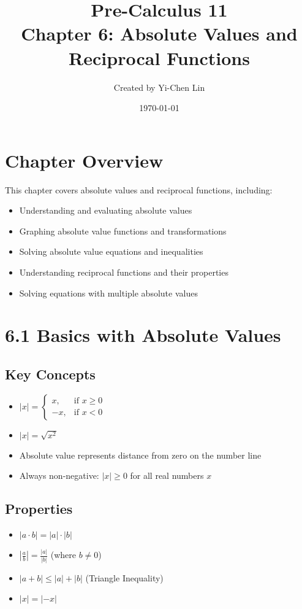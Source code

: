 \documentclass[12pt]{article}
\title{Pre-Calculus 11 \\ Chapter 6: Absolute Values and Reciprocal Functions}
\author{Created by Yi-Chen Lin}
\date{\today}
\begin{document}
\maketitle

\section*{Chapter Overview}
This chapter covers absolute values and reciprocal functions, including:
\begin{itemize}
    \item Understanding and evaluating absolute values
    \item Graphing absolute value functions and transformations
    \item Solving absolute value equations and inequalities
    \item Understanding reciprocal functions and their properties
    \item Solving equations with multiple absolute values
\end{itemize}

\section{6.1 Basics with Absolute Values}
\subsection*{Key Concepts}
\begin{tcolorbox}[colback=lightgray,colframe=primary,title=Absolute Value Definition]
    \begin{itemize}
        \item $|x| = \begin{cases} x, & \text{if } x \geq 0 \\ -x, & \text{if } x < 0 \end{cases}$
        \item $|x| = \sqrt{x^2}$
        \item Absolute value represents distance from zero on the number line
        \item Always non-negative: $|x| \geq 0$ for all real numbers $x$
    \end{itemize}
\end{tcolorbox}

\subsection*{Properties}
\begin{itemize}
    \item $|a \cdot b| = |a| \cdot |b|$
    \item $|\frac{a}{b}| = \frac{|a|}{|b|}$ (where $b \neq 0$)
    \item $|a + b| \leq |a| + |b|$ (Triangle Inequality)
    \item $|x| = |-x|$
\end{itemize}
\end{document}
